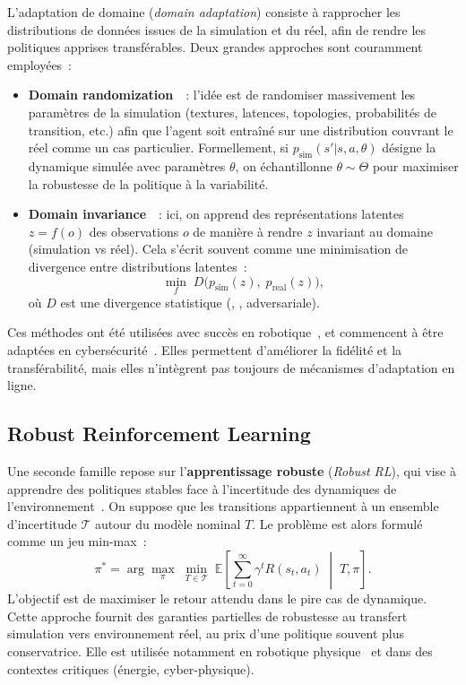 \noindent
L’adaptation de domaine (\textit{domain adaptation}) consiste à rapprocher
les distributions de données issues de la simulation et du réel,
afin de rendre les politiques apprises transférables.
Deux grandes approches sont couramment employées~:

\begin{itemize}
    \item \textbf{Domain randomization}~\cite{tobin2017domain}~: l’idée est de
          randomiser massivement les paramètres de la simulation (textures, latences, topologies,
          probabilités de transition, etc.) afin que l’agent soit entraîné sur une distribution
          couvrant le réel comme un cas particulier. Formellement, si
          $p_\text{sim}(s'|s,a,\theta)$ désigne la dynamique simulée
          avec paramètres $\theta$, on échantillonne $\theta \sim \Theta$ pour
          maximiser la robustesse de la politique à la variabilité.
    \item \textbf{Domain invariance}~\cite{ganin2016domain}~: ici, on apprend
          des représentations latentes $z = f(o)$ des observations $o$
          de manière à rendre $z$ invariant au domaine
          (simulation vs réel). Cela s’écrit souvent comme une minimisation
          de divergence entre distributions latentes~:
          \[
              \min_f \; D\big(p_\text{sim}(z), \; p_\text{real}(z)\big),
          \]
          où $D$ est une divergence statistique (, , adversariale).
\end{itemize}

\noindent
Ces méthodes ont été utilisées avec succès en robotique~\cite{tobin2017domain, peng2018sim},
et commencent à être adaptées en cybersécurité~\cite{Standen2021}.
Elles permettent d’améliorer la fidélité et la transférabilité,
mais elles n’intègrent pas toujours de mécanismes d’adaptation en ligne.

\subsection{Robust Reinforcement Learning}

\noindent
Une seconde famille repose sur l’\textbf{apprentissage robuste}
(\textit{Robust RL}), qui vise à apprendre des politiques stables
face à l’incertitude des dynamiques de l’environnement~\cite{pinto2017robust}.
On suppose que les transitions appartiennent à un ensemble d’incertitude
$\mathcal{T}$ autour du modèle nominal $T$.
Le problème est alors formulé comme un jeu min-max~:
\[
    \pi^* = \arg\max_\pi \; \min_{T \in \mathcal{T}}
    \; \mathbb{E}\!\left[\sum_{t=0}^\infty \gamma^t R(s_t,a_t) \;\middle|\; T, \pi\right].
\]
L’objectif est de maximiser le retour attendu
dans le pire cas de dynamique.
Cette approche fournit des garanties partielles de robustesse
au transfert simulation vers environnement réel,
au prix d’une politique souvent plus conservatrice.
Elle est utilisée notamment en robotique physique~\cite{pinto2017robust}
et dans des contextes critiques (énergie, cyber-physique).

